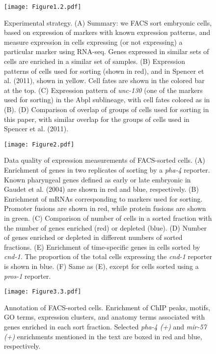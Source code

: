 \documentclass{article}
\begin{document}

\begin{figure}
\texttt{[image: Figure1.2.pdf]}
\caption{Experimental strategy.
(A) Summary: we FACS sort embryonic cells, based on expression of markers with known expression patterns, and measure expression in cells expressing (or not expressing) a particular marker using RNA-seq. Genes expressed in similar sets of cells are enriched in a similar set of samples.
(B) Expression patterns of cells used for sorting (shown in red), and in Spencer
et al. (2011), shown in yellow. Cell fates are shown in the colored bar at the
top.
(C) Expression pattern of {\em unc-130} (one of the markers used for sorting) in the Abpl sublineage, with cell fates colored as in (B).
(D) Comparison of overlap of groups of cells used for sorting in this paper, with similar overlap for the groups of cells used in Spencer et al. (2011).
}
\end{figure}
\clearpage

\begin{figure}
\texttt{[image: Figure2.pdf]}
\caption{
Data quality of expression measurements of FACS-sorted cells.
(A) Enrichment of genes in two replicates of sorting by a {\em pha-4} reporter. Known pharyngeal genes defined as early or late embryonic in Gaudet et al. (2004) are shown in red and blue, respectively. (B) Enrichment of mRNAs corresponding to markers used for sorting. Promoter fusions are shown in red, while protein fusions are shown in green. (C) Comparison of number of cells in a sorted fraction with the number of genes enriched (red) or depleted (blue). (D) Number of genes enriched or depleted in different numbers of sorted fractions. (E) Enrichment of time-specific genes in cells sorted by {\em cnd-1}. The proportion of the total cells expressing the {\em cnd-1} reporter is shown in blue. (F) Same as (E), except for cells sorted using a {\em pros-1} reporter.
}
\end{figure}
\clearpage

\begin{figure}
\texttt{[image: Figure3.3.pdf]}
\caption{
Annotation of FACS-sorted cells. Enrichment of ChIP peaks, motifs, GO terms, expression clusters, and anatomy terms associated with genes enriched in each sort fraction. Selected {\em pha-4 (+)} and {\em mir-57 (+)} enrichments mentioned in the text
are boxed in red and blue, respectively.
}
\end{figure}
\clearpage
\end{document}
